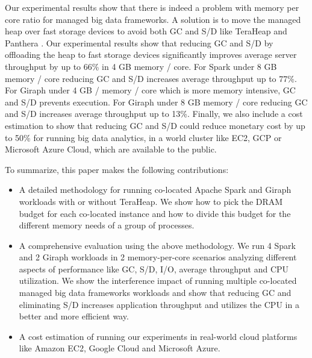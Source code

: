 Our experimental results show that there is indeed a problem with memory per core ratio
for managed big data frameworks.
A solution is to move the managed heap over fast storage devices to avoid both GC and S/D like TeraHeap and Panthera \cite{Panthera}.
Our experimental results show that reducing GC and S/D by offloading the heap to fast storage devices significantly
improves average server throughput by up to 66\% in 4 GB memory / core. 
For Spark under 8 GB memory / core reducing GC and S/D increases average throughput up to 77\%.
For Giraph under 4 GB / memory / core which is more memory intensive, GC and S/D prevents execution.
For Giraph under 8 GB memory / core reducing GC and S/D increases average throughput up to 13\%.
Finally, we also include a cost estimation to show that reducing GC and S/D could reduce monetary cost by up to 50\% for running big data
analytics, in a world cluster like EC2, GCP or Microsoft Azure Cloud, which are available to
the public.

To summarize, this paper makes the following contributions: 
\begin{itemize}
    \item{A detailed methodology for running co-located Apache Spark and Giraph
        workloads with or without TeraHeap. 
	We show how to pick the DRAM budget for each co-located instance and how to divide this budget
		for the different memory needs of a group of processes.
		}

    \item{A comprehensive evaluation using the above methodology.
	    We run 4 Spark and 2 Giraph workloads in 2 memory-per-core scenarios
	    analyzing different aspects of performance like GC, S/D, I/O, average throughput
		and CPU utilization. We show the interference impact of running multiple co-located managed big data frameworks
		workloads and show that reducing GC and eliminating S/D increases application throughput and utilizes the CPU in a better and more efficient way. }

    \item{A cost estimation of running our experiments in real-world
        cloud platforms like Amazon EC2, Google Cloud and Microsoft
        Azure.}
\end{itemize}
